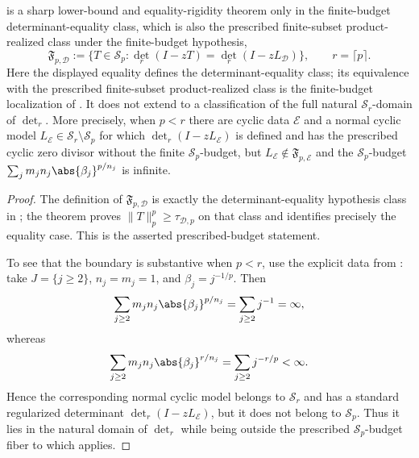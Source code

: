 \begin{corollary}
  \label{cor:schatten-prescribed-budget-boundary}
   is a sharp lower-bound
  and equality-rigidity theorem only in the finite-budget
  determinant-equality class, which is also the prescribed finite-subset
  product-realized class under the finite-budget hypothesis,
  \[
    \mathfrak F_{p,\mathcal D}
    :=\{T\in\mathcal S_p:
      \det_r(I-zT)=\det_r(I-zL_{\mathcal D})\},
    \qquad r=\lceil p\rceil .
  \]
  Here the displayed equality defines the determinant-equality class; its
  equivalence with the prescribed finite-subset product-realized class is the
  finite-budget localization of .
  It does not extend to a classification of the full natural
  \(\mathcal S_r\)-domain of \(\det_r\). More precisely, when \(p<r\)
  there are cyclic data \(\mathcal E\) and a normal cyclic model
  \(L_{\mathcal E}\in\mathcal S_r\setminus\mathcal S_p\) for which
  \(\det_r(I-zL_{\mathcal E})\) is defined and has the prescribed cyclic
  zero divisor without the finite \(\mathcal S_p\)-budget, but
  \(L_{\mathcal E}\notin\mathfrak F_{p,\mathcal E}\) and
  the \(\mathcal S_p\)-budget
  \(\sum_jm_jn_j\abs{\beta_j}^{p/n_j}\) is infinite.
\end{corollary}

\begin{proof}
  The definition of \(\mathfrak F_{p,\mathcal D}\) is exactly the
  determinant-equality hypothesis class in
  ; the theorem
  proves \(\|T\|_p^p\ge\tau_{\mathcal D,p}\) on that class and identifies
  precisely the equality case. This is the asserted prescribed-budget
  statement.

  To see that the boundary is substantive when \(p<r\), use the explicit
  data from : take
  \(J=\{j\ge2\}\), \(n_j=m_j=1\), and \(\beta_j=j^{-1/p}\). Then
  \[
    \sum_{j\ge2}m_jn_j\abs{\beta_j}^{p/n_j}
    =\sum_{j\ge2}j^{-1}=\infty,
  \]
  whereas
  \[
    \sum_{j\ge2}m_jn_j\abs{\beta_j}^{r/n_j}
    =\sum_{j\ge2}j^{-r/p}<\infty .
  \]
  Hence the corresponding normal cyclic model belongs to
  \(\mathcal S_r\) and has a standard regularized determinant
  \(\det_r(I-zL_{\mathcal E})\), but it does not belong to
  \(\mathcal S_p\). Thus it lies in the natural domain of \(\det_r\) while
  being outside the prescribed \(\mathcal S_p\)-budget fiber to which
   applies.
\end{proof}

